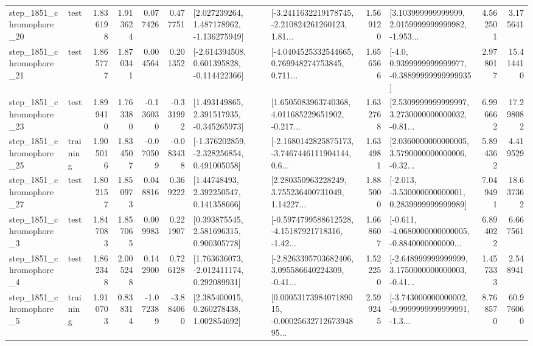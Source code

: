 \begin{tabular}{llrrrrllrlrr}
 step\_1851\_chromophore\_20 &      test &      1.836198 &    1.913624 &      0.077426 &  0.477751 &    [2.027239264, 1.487178962, -1.136275949] &  [-3.2411632219178745, -2.210824261260123, 1.81... &       1.569120 &  [3.103999999999999, 2.0159999999999982, -1.953... &            4.562501 &          3.175641 \\
 step\_1851\_chromophore\_21 &      test &      1.865777 &    1.870341 &      0.004564 &  0.201352 &   [-2.614394508, 0.601395828, -0.114422366] &  [-4.0404525332544665, 0.769948274753845, 0.711... &       1.656566 &   [-4.0, 0.9399999999999977, -0.38899999999999935] &            2.978017 &         15.414410 \\
 step\_1851\_chromophore\_23 &      test &      1.899410 &    1.763380 &     -0.136030 & -0.331992 &    [1.493149865, 2.391517935, -0.345265973] &  [1.6505083963740368, 4.011685229651902, -0.217... &       1.632768 &  [2.5309999999999997, 3.2730000000000032, -0.81... &            6.996662 &         17.298082 \\
 step\_1851\_chromophore\_25 &  training &      1.905016 &    1.834507 &     -0.070509 & -0.083438 &   [-1.376202859, -2.328256854, 0.491005058] &  [-2.1680142825875173, -3.7467446111904144, 0.6... &       1.634981 &  [2.0360000000000005, 3.5790000000000006, -0.32... &            5.894362 &          4.419529 \\
 step\_1851\_chromophore\_27 &      test &      1.802157 &    1.850973 &      0.048816 &  0.369222 &      [1.44748493, 2.392250547, 0.141358666] &  [2.280350963228249, 3.755236400731049, 1.14227... &       1.885000 &   [-2.013, -3.530000000000001, 0.2839999999999989] &            7.049491 &         18.637362 \\
  step\_1851\_chromophore\_3 &      test &      1.847083 &    1.857065 &      0.009983 &  0.221907 &     [0.393875545, 2.581696315, 0.900305778] &  [-0.5974799588612528, -4.15187921718316, -1.42... &       1.668607 &  [-0.611, -4.0680000000000005, -0.8840000000000... &            6.894022 &          6.667561 \\
  step\_1851\_chromophore\_4 &      test &      1.862348 &    2.005248 &      0.142900 &  0.726128 &    [1.763636073, -2.012411174, 0.292089931] &  [-2.8263395703682406, 3.095586640224309, -0.41... &       1.522250 &  [-2.648999999999999, 3.1750000000000003, -0.41... &            1.457333 &          2.548941 \\
  step\_1851\_chromophore\_5 &  training &      1.910703 &    0.838314 &     -1.072389 & -3.884060 &     [2.385400015, 0.260278438, 1.002854692] &  [0.0005317398407189015, -0.0002563271267394895... &       2.599245 &  [-3.743000000000002, -0.9999999999999991, -1.3... &            8.768570 &         60.976060 \\

\end{tabular}
